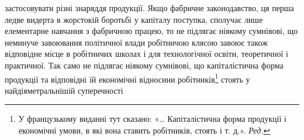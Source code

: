 застосовувати різні знаряддя продукції. Якщо фабричне законодавство,
ця перша ледве видерта в жорстокій боротьбі у капіталу
поступка, сполучає лише елементарне навчання з фабричною працею,
то не підлягає ніякому сумнівові, що неминуче завоювання
політичної влади робітничою клясою завоює також відповідне
місце в робітничих школах і для технологічної освіти, теоретичної
і практичної. Так само не підлягає ніякому сумнівові, що
капіталістична форма продукції та відповідні їй економічні відносини
робітників\footnote*{
У французькому виданні тут сказано: «\dots{} Капіталістична форма
продукції і економічні умови, в які вона ставить робітників, стоять
і т. д.». \emph{Ред.}
} стоять у найдіяметральнішій суперечності
\parbreak{}  %
